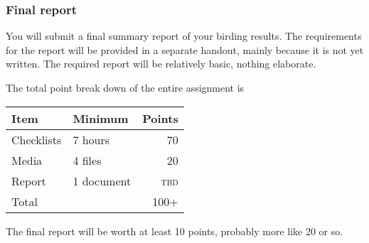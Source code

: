 \documentclass[12pt]{article}
\begin{document}
\subsubsection*{Final report}

You will submit a final summary report of your birding results. The requirements for the report will be provided in a separate handout, mainly because it is not yet written. The required report will be relatively basic, nothing elaborate.

The total point break down of the entire assignment is

\begin{tabular}{llr}
\toprule
Item &  Minimum & Points \tabularnewline
\midrule
Checklists & 7 hours & 70 \tabularnewline
Media	& 4 files	& 20 \tabularnewline
Report	& 1	document & \textsc{tbd} \tabularnewline
\midrule
Total	& 	& 100+ \tabularnewline
\bottomrule
\end{tabular}

The final report will be worth at least 10 points, probably more like 20 or so.
\end{document}
